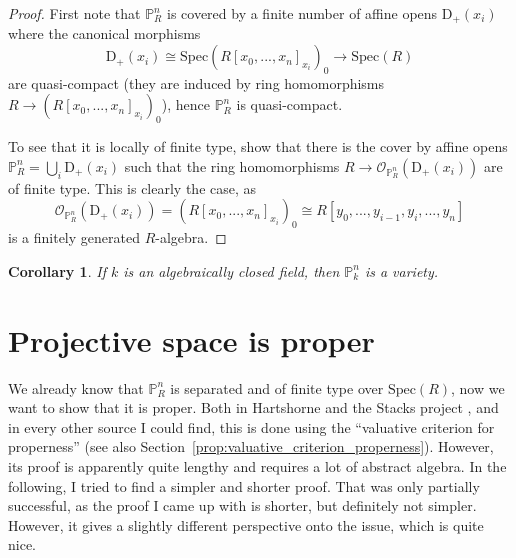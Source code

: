 \documentclass{scrartcl}
\newcommand{\D}[1]{\mathrm{D}_+(#1)}
\renewcommand{\P}{\mathbb{P}}
\newcommand{\Spec}{\mathrm{Spec}}
\renewcommand{\O}{\mathcal{O}}
\newtheorem{corollary}[subsection]{Corollary}
\theoremstyle{definition}
\begin{document}
\begin{proof}
    First note that $\P_R^n$ is covered by a finite number of affine opens $\D{x_i}$ where the canonical morphisms
    \begin{equation*}
        \D{x_i} \cong \Spec(R[x_0, ..., x_n]_{x_i})_0 \to \Spec(R)
    \end{equation*}
    are quasi-compact (they are induced by ring homomorphisms $R \to (R[x_0, ..., x_n]_{x_i})_0$), hence $\P_R^n$ is quasi-compact.

    To see that it is locally of finite type, show that there is the cover by affine opens $\P_R^n = \bigcup_i \D{x_i}$ such that the ring homomorphisms $R \to \O_{\P_R^n}(\D{x_i})$ are of finite type.
    This is clearly the case, as
    \begin{equation*}
        \O_{\P_R^n}(\D{x_i}) = (R[x_0, ..., x_n]_{x_i})_0 \cong R[y_0, ..., y_{i - 1}, y_i, ..., y_n]
    \end{equation*}
    is a finitely generated $R$-algebra.
\end{proof}
\begin{corollary}
    If $k$ is an algebraically closed field, then $\P_k^n$ is a variety.
\end{corollary}

\section{Projective space is proper}
We already know that $\P_R^n$ is separated and of finite type over $\Spec(R)$, now we want to show that it is proper.
Both in Hartshorne \cite{hartshorne} and the Stacks project \cite{stacks}, and in every other source I could find, this is done using the ``valuative criterion for properness'' (see also Section~\ref{prop:valuative_criterion_properness}).
However, its proof is apparently quite lengthy and requires a lot of abstract algebra.
In the following, I tried to find a simpler and shorter proof.
That was only partially successful, as the proof I came up with is shorter, but definitely not simpler.
However, it gives a slightly different perspective onto the issue, which is quite nice.
\end{document}
